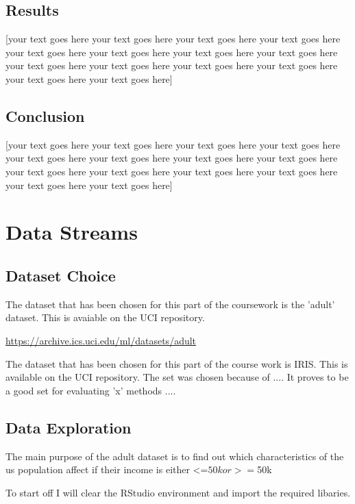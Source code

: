 \documentclass[10pt  ,usenames, dvipsnames]{article}\usepackage[]{graphicx}\usepackage[]{color}
\begin{document}
\subsection{Results}
[your text goes here your text goes here your text goes here your text goes here your text goes here your text goes here your text goes here your text goes here your text goes here your text goes here your text goes here your text goes here your text goes here your text goes here]
\subsection{Conclusion}

[your text goes here your text goes here your text goes here your text goes here your text goes here your text goes here your text goes here your text goes here your text goes here your text goes here your text goes here your text goes here your text goes here your text goes here]




\section {Data Streams}

\subsection{Dataset Choice}

The dataset that has been chosen for this part of the coursework is the 'adult' dataset. This is avaiable on the UCI repository.

\url{https://archive.ics.uci.edu/ml/datasets/adult}

The dataset that has been chosen for this part of the course work is IRIS. This is available on the UCI repository. The set was chosen because of .... It proves to be a good set for evaluating 'x' methods .... 

\subsection{Data Exploration}

The main purpose of the adult dataset is to find out which characteristics of the us population affect if their income is either <=$50k or >=$50k



To start off I will clear the RStudio environment and import the required libaries.
\end{document}

